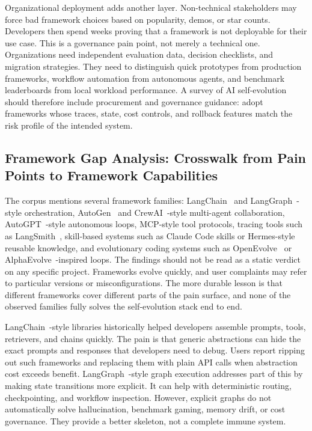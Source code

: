Organizational deployment adds another layer. Non-technical stakeholders may force bad framework choices based on popularity, demos, or star counts. Developers then spend weeks proving that a framework is not deployable for their use case. This is a governance pain point, not merely a technical one. Organizations need independent evaluation data, decision checklists, and migration strategies. They need to distinguish quick prototypes from production frameworks, workflow automation from autonomous agents, and benchmark leaderboards from local workload performance. A survey of AI self-evolution should therefore include procurement and governance guidance: adopt frameworks whose traces, state, cost controls, and rollback features match the risk profile of the intended system.

\subsection{Framework Gap Analysis: Crosswalk from Pain Points to Framework Capabilities}
\label{subsec:framework-crosswalk}

The corpus mentions several framework families: LangChain~\cite{chase2023langchain} and LangGraph~\cite{langgraph2024}-style orchestration, AutoGen~\cite{autogen2023} and CrewAI~\cite{crewai2024}-style multi-agent collaboration, AutoGPT~\cite{autogpt2023}-style autonomous loops, MCP-style tool protocols, tracing tools such as LangSmith~\cite{langgraph2024}, skill-based systems such as Claude Code skills or Hermes-style reusable knowledge, and evolutionary coding systems such as OpenEvolve~\cite{openevolve2024} or AlphaEvolve~\cite{alphaevolve2025}-inspired loops. The findings should not be read as a static verdict on any specific project. Frameworks evolve quickly, and user complaints may refer to particular versions or misconfigurations. The more durable lesson is that different frameworks cover different parts of the pain surface, and none of the observed families fully solves the self-evolution stack end to end.

LangChain~\cite{chase2023langchain}-style libraries historically helped developers assemble prompts, tools, retrievers, and chains quickly. The pain is that generic abstractions can hide the exact prompts and responses that developers need to debug. Users report ripping out such frameworks and replacing them with plain API calls when abstraction cost exceeds benefit. LangGraph~\cite{langgraph2024}-style graph execution addresses part of this by making state transitions more explicit. It can help with deterministic routing, checkpointing, and workflow inspection. However, explicit graphs do not automatically solve hallucination, benchmark gaming, memory drift, or cost governance. They provide a better skeleton, not a complete immune system.

